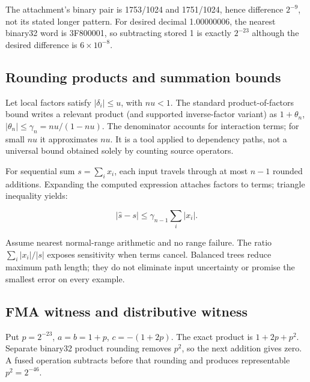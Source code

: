 The attachment's binary pair is 1753/1024 and 1751/1024, hence difference \(2^{-9}\), not its stated longer pattern. For desired decimal 1.00000006, the nearest binary32 word is 3F800001, so subtracting stored 1 is exactly \(2^{-23}\) although the desired difference is \(6\times10^{-8}\).

\subsection{Rounding products and summation bounds}\label{03-visual-computing-i-ch018-rounding-products-and-summation-bounds}

\hypertarget{03-visual-computing-i-ch018-rounding-products-and-summation-bounds}{}

Let local factors satisfy \(|\delta_i|\le u\), with \(nu<1\). The standard product-of-factors bound writes a relevant product (and supported inverse-factor variant) as \(1+\theta_n\), \(|\theta_n|\le\gamma_n=nu/(1-nu)\). The denominator accounts for interaction terms; for small \(nu\) it approximates \(nu\). It is a tool applied to dependency paths, not a universal bound obtained solely by counting source operators.

For sequential sum \(s=\sum_i x_i\), each input travels through at most \(n-1\) rounded additions. Expanding the computed expression attaches factors to terms; triangle inequality yields:

\[
|\widehat s-s|\le\gamma_{n-1}\sum_i|x_i|.
\]

Assume nearest normal-range arithmetic and no range failure. The ratio \(\sum_i|x_i|/|s|\) exposes sensitivity when terms cancel. Balanced trees reduce maximum path length; they do not eliminate input uncertainty or promise the smallest error on every example.

\subsection{FMA witness and distributive witness}\label{03-visual-computing-i-ch018-fma-witness-and-distributive-witness}

\hypertarget{03-visual-computing-i-ch018-fma-witness-and-distributive-witness}{}

Put \(p=2^{-23}\), \(a=b=1+p\), \(c=-(1+2p)\). The exact product is \(1+2p+p^2\). Separate binary32 product rounding removes \(p^2\), so the next addition gives zero. A fused operation subtracts before that rounding and produces representable \(p^2=2^{-46}\).

